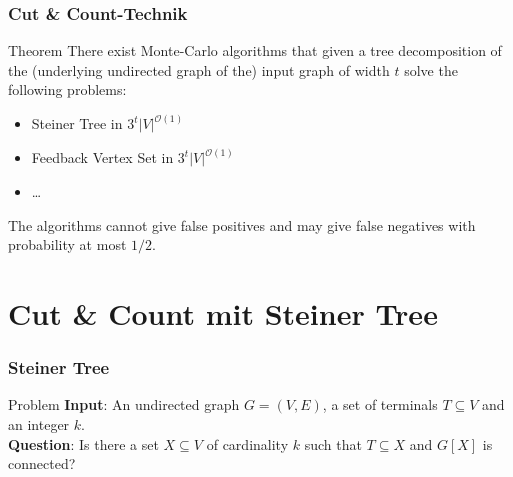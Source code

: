 \documentclass{beamer}
\begin{document}
\begin{frame}
\frametitle{Cut \& Count-Technik}
\begin{block}{Theorem}
There exist Monte-Carlo algorithms that given a tree decomposition of the (underlying undirected
graph of the) input graph of width $t$ solve the following problems:
\begin{itemize}
\item Steiner Tree in $3^t|V|^{\mathcal{O}(1)}$
\item Feedback Vertex Set in $3^t|V|^{\mathcal{O}(1)}$
\item \dots
\end{itemize}
The algorithms cannot give false positives and may give false negatives with probability at most $1/2$.
\end{block}
\end{frame}

\section{Cut \& Count mit Steiner Tree} %
\begin{frame}
\frametitle{Steiner Tree}
\begin{block}{Problem}
\textbf{Input}: An undirected graph $G = (V, E)$, a set of terminals $T \subseteq V$ and an integer $k$. \\
\textbf{Question}: Is there a set $X \subseteq V$ of cardinality $k$ such that $T \subseteq X$ and $G[X]$ is connected?
\end{block}
\end{frame}
\end{document}
